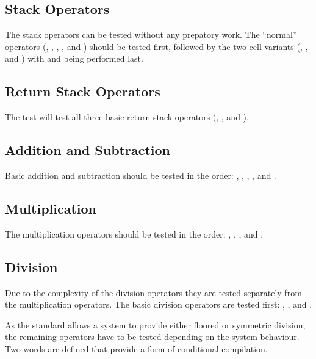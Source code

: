 \subsection{Stack Operators}

The stack operators can be tested without any prepatory work.  The
``normal'' operators
	(,
	 ,
	 ,
	 , and
	 )
should be tested first, followed by the two-cell variants
	(,
	 ,
	  and
	 )
with  and  being
performed last.

\subsection{Return Stack Operators}

The test  will test all three basic return
stack operators (, , and ).

\subsection{Addition and Subtraction}

Basic addition and subtraction should be tested in the order:
	,
	,
	,
	,
	 and
	.

\subsection{Multiplication}

The multiplication operators should be tested in the order:
	,
	,
	, and
	.

\subsection{Division}

Due to the complexity of the division operators they are tested
separately from the multiplication operators.  The basic division
operators are tested first:
	,
	, and
	.

As the standard allows a system to provide either floored or symmetric
division, the remaining operators have to be tested depending on the
system behaviour.  Two words are defined that provide a form of
conditional compilation.

